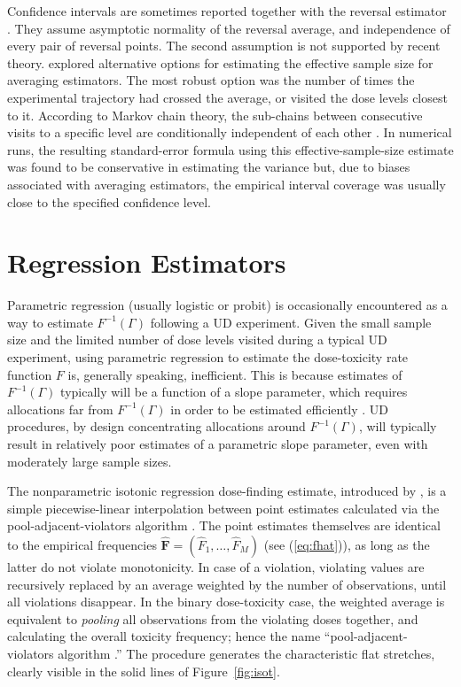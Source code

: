 Confidence intervals are sometimes reported together with the reversal estimator \citep{Capo:Parp:Lyon:Colu:Cell:Mini:2001,Camo:Capo:Lyon:Colu:Epid:2004}. They assume asymptotic normality of the reversal average, and independence of every pair of reversal points.  The second assumption is not supported by recent theory. \cite{Oron07} explored alternative options for estimating the effective sample size for averaging estimators. The most robust option was the number of times the experimental trajectory had crossed the average, or visited the dose levels closest to it. According to Markov chain theory, the sub-chains between consecutive visits to a specific level are conditionally independent of each other \citep{Tsut:rand:1967}. In numerical runs, the resulting standard-error formula using this effective-sample-size estimate was found to be conservative in estimating the variance but, due to biases associated with averaging estimators, the empirical interval coverage was usually close to the specified confidence level.

\section{Regression Estimators}

Parametric regression (usually logistic or probit) is occasionally encountered as a way to estimate $F^{-1}(\Gamma)$ following a UD experiment. Given the small sample size and the limited number of dose levels visited during a typical UD experiment, using parametric regression to estimate the dose-toxicity rate function $F$ is, generally speaking, inefficient.  This is because estimates of $F^{-1}(\Gamma)$ typically will be a function of a slope parameter, which requires allocations far from $F^{-1}(\Gamma)$ in order to be estimated efficiently \citep{Ford:Tors:Wu:use:1992}.  UD procedures, by design concentrating allocations around $F^{-1}(\Gamma)$, will typically result in relatively poor estimates  of a parametric slope parameter, even with moderately large sample sizes.

The nonparametric isotonic regression dose-finding estimate, introduced by \cite{Styl:Flou:dose:2002}, is a simple piecewise-linear interpolation between point estimates calculated via the pool-adjacent-violators algorithm \citep[PAVA,][]{BBBB:order:1972}. The point estimates themselves are identical to the empirical frequencies $\mathbf{\hat{F}}=\left(\hat{F}_1,\ldots,\hat{F}_M\right)$ (see (\ref{eq:fhat})), as long as the latter do not violate monotonicity. In case of a violation, violating values are recursively replaced by an average weighted by the number of observations, until all violations disappear. In the binary dose-toxicity case, the weighted average is equivalent to \emph{pooling} all observations from the violating doses together, and calculating the overall toxicity frequency; hence the name ``pool-adjacent-violators algorithm .'' The procedure generates the characteristic flat stretches, clearly visible in the solid lines of Figure~\ref{fig:isot}.

